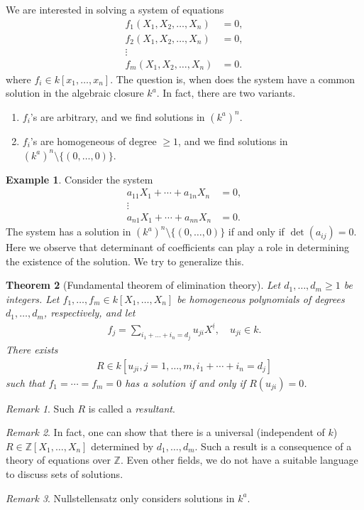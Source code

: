 \documentclass[12pt]{report}
\theoremstyle{plain}
\newtheorem{theorem}{Theorem}[section]
\theoremstyle{remark}
\newtheorem*{remark}{Remark}
\theoremstyle{definition}
\newtheorem{example}[theorem]{Example}
\newcommand{\Z}{\mathbb{Z}}
\begin{document}
We are interested in solving a system of equations
\begin{align*}
    f_1(X_1,X_2,\dots,X_n)&=0, \\
    f_2(X_1,X_2,\dots,X_n)&=0, \\
    \vdots \\
    f_m(X_1,X_2,\dots,X_n)&=0.
\end{align*}
where $f_i\in k[x_1,\dots,x_n]$. The question is, when does the system have a common solution in the algebraic closure $k^a$. In fact, there are two variants.
\begin{enumerate}
    \item $f_i$'s are arbitrary, and we find solutions in $(k^a)^n$.
    \item $f_i$'s are homogeneous of degree $\ge 1$, and we find solutions in $(k^a)^n\setminus \{(0,\dots,0)\}$.
\end{enumerate}

\begin{example}
    Consider the system
    \begin{align*}
        a_{11}X_1+\cdots+a_{1n}X_n &= 0, \\
        \vdots \\
        a_{n1}X_1+\cdots+a_{nn}X_n &= 0.
    \end{align*}
    The system has a solution in $(k^a)^n\setminus \{(0,\dots,0)\}$ if and only if $\det (a_{ij})=0$. Here we observe that determinant of coefficients can play a role in determining the existence of the solution. We try to generalize this.
\end{example}

\begin{theorem}[Fundamental theorem of elimination theory]
    Let $d_1,\dots,d_m\ge 1$ be integers. Let $f_1,\dots,f_m\in k[X_1,\dots,X_n]$ be homogeneous polynomials of degrees $d_1,\dots,d_m$, respectively, and let
    \begin{align*}
        f_j = \sum_{i_1+\dots+i_n=d_j} u_{ji}X^{\underline{i}},\quad u_{ji}\in k.
    \end{align*}
    There exists
    \begin{align*}
        R\in k[u_{ji},j=1,\dots,m,i_1+\cdots+i_n=d_j]
    \end{align*}
    such that $f_1=\cdots=f_m=0$ has a solution if and only if $R(u_{ji})=0$.
\end{theorem}
\begin{remark}
    Such $R$ is called a \emph{resultant}.
\end{remark}
\begin{remark}
     In fact, one can show that there is a universal (independent of $k$) $R\in \Z[X_1,\dots,X_n]$ determined by $d_1,\dots,d_m$. Such a result is a consequence of a theory of equations over $\Z$. Even other fields, we do not have a suitable language to discuss sets of solutions.
\end{remark}
\begin{remark}
     Nullstellensatz only considers solutions in $k^a$.
\end{remark}
\end{document}
